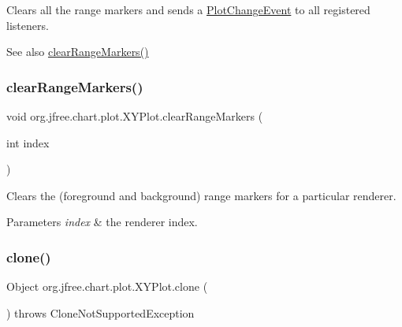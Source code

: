 Clears all the range markers and sends a \mbox{\hyperlink{}{Plot\+Change\+Event}} to all registered listeners.

\begin{DoxySeeAlso}{See also}
\mbox{\hyperlink{classorg_1_1jfree_1_1chart_1_1plot_1_1_x_y_plot_a285a7793a2beb946d4beae4b02187f3c}{clear\+Range\+Markers()}} 
\end{DoxySeeAlso}
\mbox{\label{classorg_1_1jfree_1_1chart_1_1plot_1_1_x_y_plot_a7c45c1345592c8ec8e0082b268649a5c}} 
\subsubsection{\texorpdfstring{clear\+Range\+Markers()}{clearRangeMarkers()}\hspace{0.1cm}{\footnotesize\ttfamily [2/2]}}
{\footnotesize\ttfamily void org.\+jfree.\+chart.\+plot.\+X\+Y\+Plot.\+clear\+Range\+Markers (\begin{DoxyParamCaption}\item[{int}]{index }\end{DoxyParamCaption})}

Clears the (foreground and background) range markers for a particular renderer.


\begin{DoxyParams}{Parameters}
{\em index} & the renderer index. \\
\hline
\end{DoxyParams}
\mbox{\label{classorg_1_1jfree_1_1chart_1_1plot_1_1_x_y_plot_a0a7a341c89e75eeb6fc3eb1042e67cb3}} 
\subsubsection{\texorpdfstring{clone()}{clone()}}
{\footnotesize\ttfamily Object org.\+jfree.\+chart.\+plot.\+X\+Y\+Plot.\+clone (\begin{DoxyParamCaption}{ }\end{DoxyParamCaption}) throws Clone\+Not\+Supported\+Exception}

